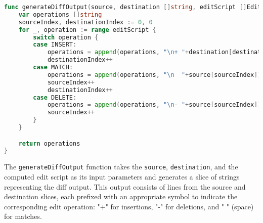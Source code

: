 \begin{lstlisting}[language=go]
func generateDiffOutput(source, destination []string, editScript []EditOperation) []string {
	var operations []string
	sourceIndex, destinationIndex := 0, 0
	for _, operation := range editScript {
		switch operation {
		case INSERT:
			operations = append(operations, "\n+ "+destination[destinationIndex])
			destinationIndex++
		case MATCH:
			operations = append(operations, "\n  "+source[sourceIndex])
			sourceIndex++
			destinationIndex++
		case DELETE:
			operations = append(operations, "\n- "+source[sourceIndex])
			sourceIndex++
		}
	}

	return operations
}
\end{lstlisting}
\medskip

The \lstinline{generateDiffOutput} function takes the \lstinline{source}, \lstinline{destination}, and the computed edit script as its input parameters and generates a slice of strings representing the diff output. This output consists of lines from the source and destination slices, each prefixed with an appropriate symbol to indicate the corresponding edit operation: "+" for insertions, "-" for deletions, and " " (space) for matches.

